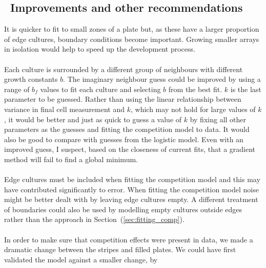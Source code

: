 \subsection{\thesubsection~Improvements and other recommendations}

It is quicker to fit to small zones of a plate but, as these have a
larger proportion of edge cultures, boundary conditions become
important. Growing smaller arrays in isolation would help to speed up
the development process.
\\\\
Each culture is surrounded by a different group of neighbours with
different growth constants \(b\). The imaginary neighbour guess could
be improved by using a range of \(b_{f}\) values to fit each culture
and selecting \(b\) from the best fit. \(k\) is the last parameter to
be guessed. Rather than using the linear relationship between variance
in final cell measurement and \(k\), which may not hold for large
values of \(k\), it would be better and just as quick to guess a value
of \(k\) by fixing all other parameters as the guesses and fitting the
competition model to data. It would also be good to compare with
guesses from the logistic model. Even with an improved guess, I
suspect, based on the closeness of current fits, that a gradient
method will fail to find a global minimum.
\\\\
Edge cultures must be included when fitting the competition model and
this may have contributed significantly to error. When fitting the
competition model noise might be better dealt with by leaving edge
cultures empty. A different treatment of boundaries could also be used
by modelling empty cultures outside edges rather than the approach in
Section~(\ref{sec:fitting_comp}).
\\\\
In order to make sure that competition effects were present in data,
we made a dramatic change between the stripes and filled plates. We
could have first validated the model against a smaller change, by
